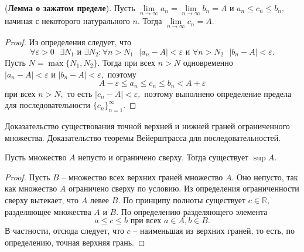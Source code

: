 \begin{theorem} (\textbf{Лемма о зажатом пределе}).
    Пусть
    $\lim\limits_{n\rightarrow\infty}a_n=
        \lim\limits_{n\rightarrow\infty}b_n=A$
    и $a_n\leq c_n\leq b_n,$ начиная
    с некоторого натурального $n.$
    Тогда $\lim\limits_{n\rightarrow\infty}c_n=A.$
\end{theorem}
\begin{proof}
    Из определения следует, что $$\forall\varepsilon>0
        \textrm{ }\exists N_1 \textrm{ и } \exists N_2:
        \forall n>N_1\textrm{ }|a_n-A|<\varepsilon \textrm{ и }
        \forall n>N_2\textrm{ }|b_n-A|<\varepsilon.$$
    Пусть $N=\max\{N_1, N_2\}.$
    Тогда при всех $n>N$ одновременно
    $|a_n-A|<\varepsilon \textrm{ и } |b_n-A|<\varepsilon,$
    поэтому $$A-\varepsilon\leq a_n\leq c_n\leq b_n<
        A+\varepsilon$$ при всех $n>N,$ то есть
    $|c_n-A|<\varepsilon,$ поэтому выполнено
    определение предела для последовательности
    $\{c_n\}_{n=1}^{\infty}.$
\end{proof}

\newpage
\begin{problem}
Доказательство существования точной верхней и нижней граней ограниченного множества. Доказательство теоремы Вейерштрасса для последовательностей.
\end{problem}

\begin{theorem}
    Пусть множество $A$ непусто и ограничено
    сверху. Тогда существует $\sup A.$
\end{theorem}
\begin{proof}
    Пусть $B$ -- множество всех верхних граней
    множество $A.$ Оно непусто, так как множество
    $A$ ограничено сверху по условию. Из
    определения ограниченности сверху вытекает,
    что $A$ левее $B.$ По принципу полноты
    существует $c\in\mathbb{R},$ разделяющее
    множества $A$ и $B$. По определению
    разделяющего элемента $$a\leq c\leq b
        \textrm{ при всех } a\in A, b\in B.$$ В частности,
    отсюда следует, что $c$ -- наименьшая
    из верхних граней, то есть, по определению,
    точная верхняя грань.
\end{proof}

